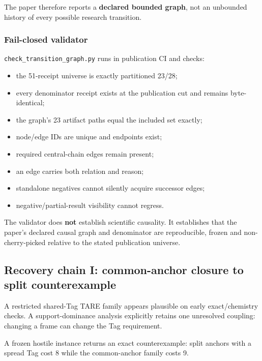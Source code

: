 \documentclass[preprint,12pt]{elsarticle}
\providecommand{\tightlist}{%
  \setlength{\itemsep}{0pt}\setlength{\parskip}{0pt}}
\begin{document}
The paper therefore reports a \textbf{declared bounded graph}, not an
unbounded history of every possible research transition.

\hypertarget{fail-closed-validator}{%
\subsubsection{Fail-closed validator}\label{fail-closed-validator}}

\texttt{check\_transition\_graph.py} runs in publication CI and checks:

\begin{itemize}
\tightlist
\item
  the 51-receipt universe is exactly partitioned 23/28;
\item
  every denominator receipt exists at the publication cut and remains
  byte-identical;
\item
  the graph's 23 artifact paths equal the included set exactly;
\item
  node/edge IDs are unique and endpoints exist;
\item
  required central-chain edges remain present;
\item
  an edge carries both relation and reason;
\item
  standalone negatives cannot silently acquire successor edges;
\item
  negative/partial-result visibility cannot regress.
\end{itemize}

The validator does \textbf{not} establish scientific causality. It
establishes that the paper's declared causal graph and denominator are
reproducible, frozen and non-cherry-picked relative to the stated
publication universe.

\hypertarget{recovery-chain-i-common-anchor-closure-to-split-counterexample}{%
\subsection{Recovery chain I: common-anchor closure to split
counterexample}\label{recovery-chain-i-common-anchor-closure-to-split-counterexample}}

A restricted shared-Tag TARE family appears plausible on early
exact/chemistry checks. A support-dominance analysis explicitly retains
one unresolved coupling: changing a frame can change the Tag
requirement.

A frozen hostile instance returns an exact counterexample: split anchors
with a spread Tag cost 8 while the common-anchor family costs 9.
\end{document}
